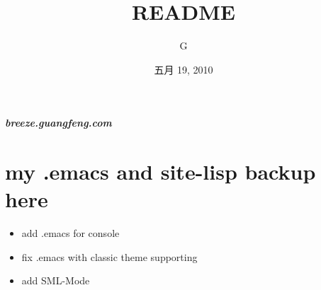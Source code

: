 \documentclass{article}
\begin{document}
\title{README}
\author{G}
\date{五月 19, 2010}

\maketitle



\textbf{\emph{breeze.guangfeng\@googlemail.com}}

\section{my .emacs and site-lisp backup here}

\begin{itemize}
\item add .emacs for console
\item fix .emacs with classic theme supporting
\item add SML-Mode
\end{itemize}
\end{document}
